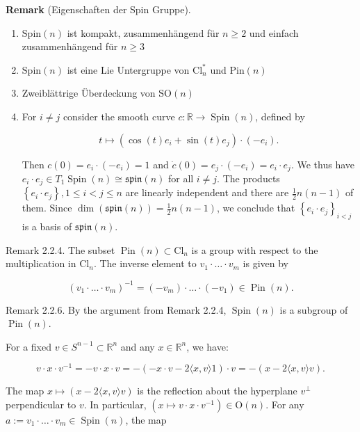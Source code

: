 \documentclass[10pt, letterpaper]{article}
\newcommand{\Cl}{\mathrm{Cl}}
\newcommand{\SO}{\mathrm{SO}}
\newcommand{\Spin}{\mathrm{Spin}}
\newcommand{\Pin}{\mathrm{Pin}}
\newcommand{\CustomHeading}[3]{%
  \par\medskip\noindent%
  \textbf{#1 #2} \textnormal{(#3)}.\enskip%
}
\newenvironment{REM}[2]{\CustomHeading{Remark}{#1}{#2}}{}
\begin{document}
\begin{REM}{}{Eigenschaften der Spin Gruppe}
  \begin{enumerate}
    \item $\Spin(n)$ ist kompakt, zusammenhängend für $n\geq 2$ und einfach zusammenhängend für $n\geq 3$
    \item $\Spin(n)$ ist eine Lie Untergruppe von $\Cl^*_n$ und $\Pin(n)$
    \item Zweiblättrige Überdeckung von $\SO(n)$
    \item {\color{blue}For $i \neq j$ consider the smooth curve $c: \mathbb{R} \rightarrow \operatorname{Spin}(n)$, defined by

    $$
    t \mapsto\left(\cos (t) e_i+\sin (t) e_j\right) \cdot\left(-e_i\right) .
    $$


    Then $c(0)=e_i \cdot\left(-e_i\right)=1$ and $\dot{c}(0)=e_j \cdot\left(-e_i\right)=e_i \cdot e_j$. We thus have $e_i \cdot e_j \in T_1 \operatorname{Spin}(n) \cong \mathfrak{s p i n}(n)$ for all $i \neq j$.
    The products $\left\{e_i \cdot e_j\right\}, 1 \leq i<j \leq n$ are linearly independent and there are $\frac{1}{2} n(n-1)$ of them. Since $\operatorname{dim}(\mathfrak{s p i n}(n))=\frac{1}{2} n(n-1)$, we conclude that $\left\{e_i \cdot e_j\right\}_{i<j}$ is a basis of $\mathfrak{s p i n}(n)$.}
  \end{enumerate}
\end{REM}


Remark 2.2.4. The subset $\operatorname{Pin}(n) \subset \mathrm{Cl}_n$ is a group with respect to the multiplication in $\mathrm{Cl}_n$. The inverse element to $v_1 \cdot \ldots \cdot v_m$ is given by

$$
\left(v_1 \cdot \ldots \cdot v_m\right)^{-1}=\left(-v_m\right) \cdot \ldots \cdot\left(-v_1\right) \in \operatorname{Pin}(n) .
$$

Remark 2.2.6. By the argument from Remark 2.2.4, $\operatorname{Spin}(n)$ is a subgroup of $\operatorname{Pin}(n)$.


For a fixed $v \in S^{n-1} \subset \mathbb{R}^n$ and any $x \in \mathbb{R}^n$, we have:

$$
v \cdot x \cdot v^{-1}=-v \cdot x \cdot v=-(-x \cdot v-2\langle x, v\rangle 1) \cdot v=-(x-2\langle x, v\rangle v) .
$$


The map $x \mapsto(x-2\langle x, v\rangle v)$ is the reflection about the hyperplane $v^{\perp}$ perpendicular to $v$. In particular, $\left(x \mapsto v \cdot x \cdot v^{-1}\right) \in \mathrm{O}(n)$. For any $a:=v_1 \cdot \ldots \cdot v_m \in \operatorname{Spin}(n)$, the map
\end{document}

